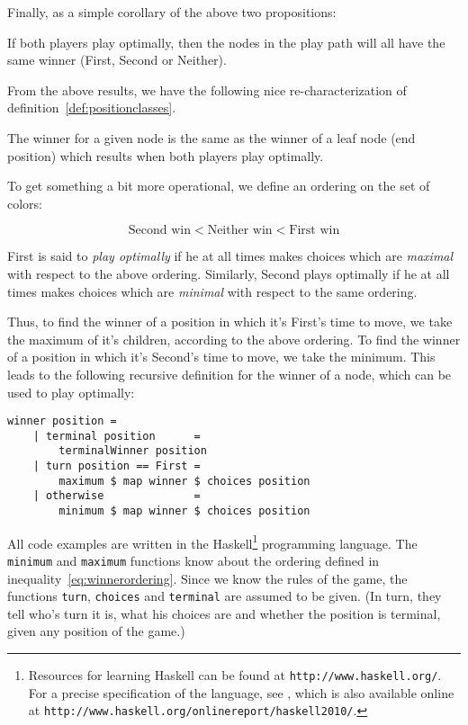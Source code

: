 Finally, as a simple corollary of the above two propositions:

\begin{proposition}
If both players play optimally, then the nodes in the play path will all have the same winner (First, Second or Neither).
\end{proposition}
From the above results, we have the following nice re-characterization of definition~\ref{def:positionclasses}.

\begin{theorem}
The winner for a given node is the same as the winner of a leaf node (end position) which results when both players play optimally.
\end{theorem}
To get something a bit more operational, we define an ordering on the set of colors:

\begin{equation}
\label{eq:winnerordering}
  \text{Second win} < \text{Neither win} < \text{First win}
\end{equation}

\begin{definition}
First is said to \emph{play optimally} if he at all times makes choices which are \emph{maximal} with respect to the above ordering.
Similarly, Second plays optimally if he at all times makes choices which are \emph{minimal} with respect to the same ordering.
\end{definition}

Thus, to find the winner of a position in which it's First's time to move, we take the maximum of it's children, according to the above ordering.
To find the winner of a position in which it's Second's time to move, we take the minimum.
This leads to the following recursive definition for the winner of a node, which can be used to play optimally:

\begin{minipage}{\linewidth}
\begin{lstlisting}[frame=single, caption={Winner function (no pruning)}, label={codelisting:winner-nopruning}]
  winner position =
    | terminal position      =
        terminalWinner position
    | turn position == First =
        maximum $ map winner $ choices position
    | otherwise              =
        minimum $ map winner $ choices position
\end{lstlisting}
\end{minipage}
All code examples are written in the Haskell\footnote{Resources for learning Haskell can be found at \texttt{http://www.haskell.org/}. For a precise specification of the language, see \citep{haskell_report}, which is also available online at \texttt{http://www.haskell.org/onlinereport/haskell2010/}.} programming language.
The \texttt{minimum} and \texttt{maximum} functions know about the ordering defined in inequality~\ref{eq:winnerordering}.
Since we know the rules of the game, the functions \texttt{turn}, \texttt{choices} and \texttt{terminal} are assumed to be given.
(In turn, they tell who's turn it is, what his choices are and whether the position is terminal, given any position of the game.)

